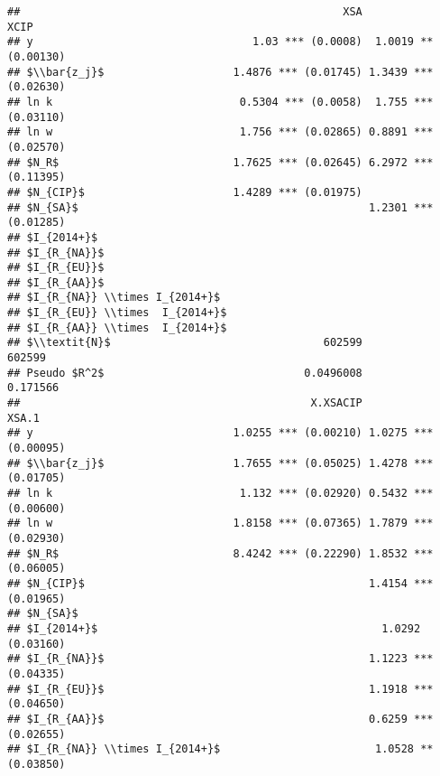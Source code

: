 \documentclass[
]{article}
\begin{document}
\begin{verbatim}
##                                                  XSA                 XCIP
## y                                  1.03 *** (0.0008)  1.0019 ** (0.00130)
## $\\bar{z_j}$                    1.4876 *** (0.01745) 1.3439 *** (0.02630)
## ln k                             0.5304 *** (0.0058)  1.755 *** (0.03110)
## ln w                             1.756 *** (0.02865) 0.8891 *** (0.02570)
## $N_R$                           1.7625 *** (0.02645) 6.2972 *** (0.11395)
## $N_{CIP}$                       1.4289 *** (0.01975)                     
## $N_{SA}$                                             1.2301 *** (0.01285)
## $I_{2014+}$                                                              
## $I_{R_{NA}}$                                                             
## $I_{R_{EU}}$                                                             
## $I_{R_{AA}}$                                                             
## $I_{R_{NA}} \\times I_{2014+}$                                           
## $I_{R_{EU}} \\times  I_{2014+}$                                          
## $I_{R_{AA}} \\times  I_{2014+}$                                          
## $\\textit{N}$                                 602599               602599
## Pseudo $R^2$                               0.0496008             0.171566
##                                             X.XSACIP                XSA.1
## y                               1.0255 *** (0.00210) 1.0275 *** (0.00095)
## $\\bar{z_j}$                    1.7655 *** (0.05025) 1.4278 *** (0.01705)
## ln k                             1.132 *** (0.02920) 0.5432 *** (0.00600)
## ln w                            1.8158 *** (0.07365) 1.7879 *** (0.02930)
## $N_R$                           8.4242 *** (0.22290) 1.8532 *** (0.06005)
## $N_{CIP}$                                            1.4154 *** (0.01965)
## $N_{SA}$                                                                 
## $I_{2014+}$                                            1.0292   (0.03160)
## $I_{R_{NA}}$                                         1.1223 *** (0.04335)
## $I_{R_{EU}}$                                         1.1918 *** (0.04650)
## $I_{R_{AA}}$                                         0.6259 *** (0.02655)
## $I_{R_{NA}} \\times I_{2014+}$                        1.0528 ** (0.03850)

\end{verbatim}
\end{document}
